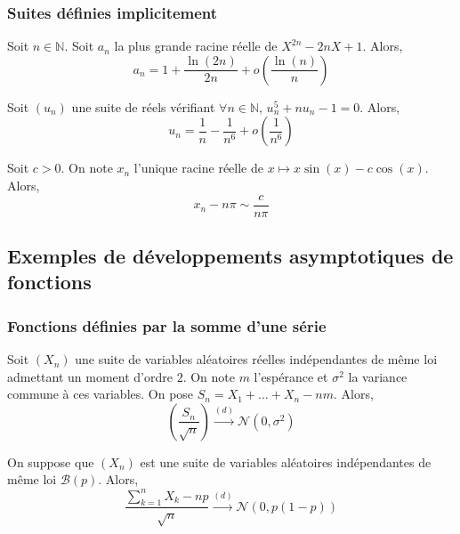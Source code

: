 	\subsubsection{Suites définies implicitement}
	
	
	\begin{example}
		Soit $n \in \mathbb{N}$. Soit $a_n$ la plus grande racine réelle de $X^{2n} - 2n X + 1$. Alors,
		\[ a_n = 1 + \frac{\ln(2n)}{2n} + o\left( \frac{\ln(n)}{n} \right) \]
	\end{example}
	
	\begin{example}
		Soit $(u_n)$ une suite de réels vérifiant $\forall n \in \mathbb{N}, \, u_n^5 + nu_n - 1 = 0$. Alors,
		\[ u_n = \frac{1}{n} - \frac{1}{n^6} + o \left( \frac{1}{n^6} \right) \]
	\end{example}
	
	\begin{example}
		Soit $c > 0$. On note $x_n$ l'unique racine réelle de $x \mapsto x \sin(x) - c \cos(x)$. Alors,
		\[ x_n - n\pi \sim \frac{c}{n\pi} \]
	\end{example}
	
	\subsection{Exemples de développements asymptotiques de fonctions}
	
	\subsubsection{Fonctions définies par la somme d'une série}
	
	
	\begin{theorem}
		Soit $(X_n)$ une suite de variables aléatoires réelles indépendantes de même loi admettant un moment d'ordre $2$. On note $m$ l'espérance et $\sigma^2$ la variance commune à ces variables. On pose $S_n = X_1 + \dots + X_n - nm$. Alors,
		\[ \left ( \frac{S_n}{\sqrt{n}} \right) \overset{(d)}{\longrightarrow} \mathcal{N}(0, \sigma^2) \]
	\end{theorem}
	
	\begin{application}
		On suppose que $(X_n)$ est une suite de variables aléatoires indépendantes de même loi $\mathcal{B}(p)$. Alors,
		\[ \frac{\sum_{k=1}^{n} X_k - np}{\sqrt{n}} \overset{(d)}{\longrightarrow} \mathcal{N}(0, p(1-p)) \]
	\end{application}
	
